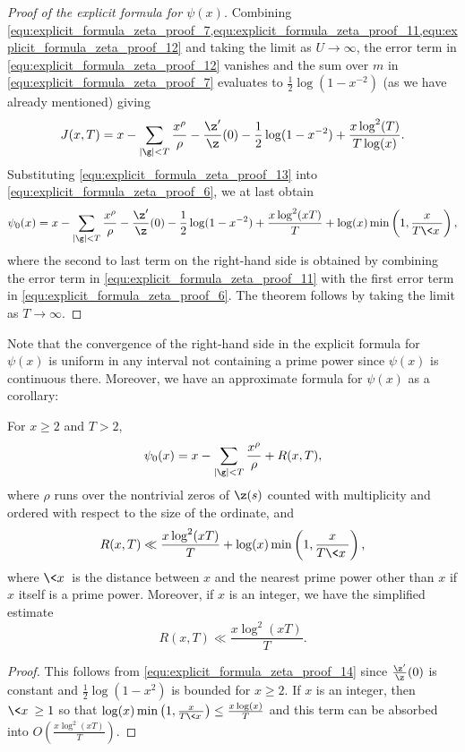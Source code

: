 \begin{proof}[Proof of the explicit formula for $\psi(x)$]
      Combining \cref{equ:explicit_formula_zeta_proof_7,equ:explicit_formula_zeta_proof_11,equ:explicit_formula_zeta_proof_12} and taking the limit as $U \to \infty$, the error term in \cref{equ:explicit_formula_zeta_proof_12} vanishes and the sum over $m$ in \cref{equ:explicit_formula_zeta_proof_7} evaluates to $\frac{1}{2}\log(1-x^{-2})$ (as we have already mentioned) giving
      \begin{equation}\label{equ:explicit_formula_zeta_proof_13}
        J(x,T) = x-\sum_{|\g| < T}\frac{x^{\rho}}{\rho}-\frac{\z'}{\z}(0)-\frac{1}{2}\log(1-x^{-2})+\frac{x\log^{2}(T)}{T\log(x)}.
      \end{equation}
      Substituting \cref{equ:explicit_formula_zeta_proof_13} into \cref{equ:explicit_formula_zeta_proof_6}, we at last obtain
      \begin{equation}\label{equ:explicit_formula_zeta_proof_14}
        \psi_{0}(x) = x-\sum_{|\g| < T}\frac{x^{\rho}}{\rho}-\frac{\z'}{\z}(0)-\frac{1}{2}\log(1-x^{-2})+\frac{x\log^{2}(xT)}{T}+\log(x)\min\left(1,\frac{x}{T\<x\>}\right),
      \end{equation}
      where the second to last term on the right-hand side is obtained by combining the error term in \cref{equ:explicit_formula_zeta_proof_11} with the first error term in \cref{equ:explicit_formula_zeta_proof_6}. The theorem follows by taking the limit as $T \to \infty$.
    \end{proof}

    Note that the convergence of the right-hand side in the explicit formula for $\psi(x)$ is uniform in any interval not containing a prime power since $\psi(x)$ is continuous there. Moreover, we have an approximate formula for $\psi(x)$ as a corollary:

    \begin{corollary}\label{cor:explicit_formula_zeta_corollary}
      For $x \ge 2$ and $T > 2$,
      \[
        \psi_{0}(x) = x-\sum_{|\g| < T}\frac{x^{\rho}}{\rho}+R(x,T),
      \]
      where $\rho$ runs over the nontrivial zeros of $\z(s)$ counted with multiplicity and ordered with respect to the size of the ordinate, and
      \[
        R(x,T) \ll \frac{x\log^{2}(xT)}{T}+\log(x)\min\left(1,\frac{x}{T\<x\>}\right),
      \]
      where $\<x\>$ is the distance between $x$ and the nearest prime power other than $x$ if $x$ itself is a prime power. Moreover, if $x$ is an integer, we have the simplified estimate
      \[
        R(x,T) \ll \frac{x\log^{2}(xT)}{T}.
      \]
    \end{corollary}
    \begin{proof}
      This follows from \cref{equ:explicit_formula_zeta_proof_14} since $\frac{\z'}{\z}(0)$ is constant and $\frac{1}{2}\log(1-x^{2})$ is bounded for $x \ge 2$. If $x$ is an integer, then $\<x\> \ge 1$ so that $\log(x)\min\left(1,\frac{x}{T\<x\>}\right) \le \frac{x\log(x)}{T}$ and this term can be absorbed into $O\left(\frac{x\log^{2}(xT)}{T}\right)$.
    \end{proof}

